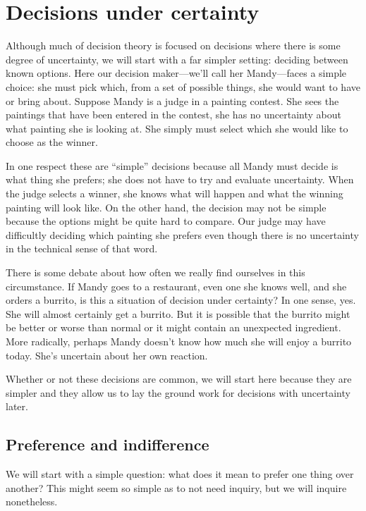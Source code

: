 \chapter{Decisions under certainty}
\label{c:certainty}

Although much of decision theory is focused on decisions where there is some degree of uncertainty, we will start with a far simpler setting: deciding between known options.  Here our decision maker---we'll call her Mandy---faces a simple choice: she must pick which, from a set of possible things, she would want to have or bring about. Suppose Mandy is a judge in a painting contest.  She sees the paintings that have been entered in the contest, she has no uncertainty about what painting she is looking at. She simply must select which she would like to choose as the winner.

In one respect these are ``simple'' decisions because all Mandy must decide is what thing she prefers; she does not have to try and evaluate uncertainty.  When the judge selects a winner, she knows what will happen and what the winning painting will look like. On the other hand, the decision may not be simple because the options might be quite hard to compare. Our judge may have difficultly deciding which painting she prefers even though there is no uncertainty in the technical sense of that word.

There is some debate about how often we really find ourselves in this circumstance.  If Mandy goes to a restaurant, even one she knows well, and she orders a burrito, is this a situation of decision under certainty?  In one sense, yes.  She will almost certainly get a burrito.  But it is possible that the burrito might be better or worse than normal or it might contain an unexpected ingredient. More radically, perhaps Mandy doesn't know how much she will enjoy a burrito today. She's uncertain about her own reaction.

Whether or not these decisions are common, we will start here because they are simpler and they allow us to lay the ground work for decisions with uncertainty later.

\section{Preference and indifference}

We will start with a simple question: what does it mean to prefer one thing over another?  This might seem so simple as to not need inquiry, but we will inquire nonetheless.

